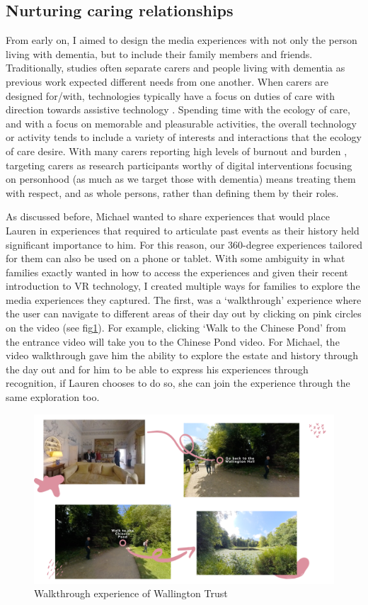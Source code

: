 \subsection{Nurturing caring relationships}
\label{momentBoxes:caringRelationships}
From early on, I aimed to design the media experiences with not only the person living with dementia, but to include their family members and friends. Traditionally, studies often separate carers and people living with dementia as previous work expected different needs from one another. When carers are designed for/with, technologies typically have a focus on duties of care with direction towards assistive technology  \citep{bennett_assistive_2017, bharucha2009intelligent,gibson2015everyday}. Spending time with the ecology of care, and with a focus on memorable and pleasurable activities, the overall technology or activity tends to include a variety of interests and interactions that the ecology of care desire. With many carers reporting high levels of burnout and burden \citep{takai_experience_2009}, targeting carers as research participants worthy of digital interventions focusing on personhood (as much as we target those with dementia) means treating them with respect, and as whole persons, rather than defining them by their roles. 

As discussed before, Michael wanted to share experiences that would place Lauren in experiences that required to articulate past events as their history held significant importance to him. For this reason, our 360-degree experiences tailored for them can also be used on a phone or tablet. With some ambiguity in what families exactly wanted in how to access the experiences and given their recent introduction to VR technology, I created multiple ways for families to explore the media experiences they captured. The first, was a ‘walkthrough’ experience where the user can navigate to different areas of their day out by clicking on pink circles on the video (see fig\ref{fig:wallingtonTrust}). For example, clicking ‘Walk to the Chinese Pond’ from the entrance video will take you to the Chinese Pond video. For Michael, the video walkthrough gave him the ability to explore the estate and history through the day out and for him to be able to express his experiences through recognition, if Lauren chooses to do so, she can join the experience through the same exploration too. 

\begin{figure}
\centering
\includegraphics[width=.8\linewidth]{Images/WalktrhoughOfWallington.png}
\caption{Walkthrough experience of Wallington Trust}
\label{fig:wallingtonTrust}
\end{figure}

